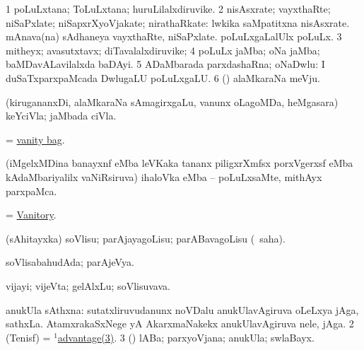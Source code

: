 \bentry
{} 
\gl{\nA}
\bmng
\bnum
\num{1} poLuLxtana; ToLuLxtana; huruLilalxdiruvike. 
\num{2} nisAsxrate; vayxthaRte; niSaPxlate; niSapxrXyoVjakate; nirathaRkate:  lwkika saMpatitxna nisAsxrate.  mAnava(na) sAdhaneya vayxthaRte, niSaPxlate.  poLuLxgaLalUlx poLuLx. 
\num{3} mitheyx; avasutxtavx; diTavalalxdiruvike; 
\num{4} poLuLx jaMba; oNa jaMba; baMDavALavilalxda baDAyi. 
\num{5} ADaMbarada parxdashaRna; oNaDwlu:  I duSaTxparxpaMcada DwlugaLU poLuLxgaLU. 
\num{6} (\ame) alaMkaraNa meVju. 
\enum
\emng
\eentry

\bentry
{}
\gl{\nA}
\expl{}
\bmng
 (kirugananxDi, alaMkaraNa sAmagirxgaLu, \mo vanunx oLagoMDa, heMgasara) keYciVla; jaMbada ciVla. 
\emng
\eentry

\bentry
{}
\gl{\nA}
\expl{}
\bmng
 = \hyperlink{vanity bag}{vanity bag}. 
\emng
\eentry

\bentry
{}
\gl{\nA}
\expl{}
\bmng
 (iMgelxMDina banayxnf eMba leVKaka tananx piligxrXmfsx porxVgerxsf eMba kAdaMbariyalilx vaNiRsiruva) ihaloVka eMba -- poLuLxsaMte, mithAyx parxpaMca. 
\emng
\eentry

\bentry
{}
\gl{\nA}
\expl{}
\bmng
 = \hyperlink{Vanitory}{Vanitory}. 
\emng
\eentry

\bentry
{} 
\gl{\akirx}
\expl{}
\bmng
 (sAhitayxka) soVlisu; parAjayagoLisu; parABavagoLisu (\rUpa\ saha). 
\emng
\eentry

\bentry
{} 
\gl{\gu}
\expl{}
\bmng
 soVlisabahudAda; parAjeVya. 
\emng
\eentry

\bentry
{} 
\gl{\nA}
\expl{}
\bmng
 vijayi; vijeVta; gelAlxLu; soVlisuvava. 
\emng
\eentry

\bentry
{} 
\gl{\nA}
\expl{}
\bmng
\bnum
{} anukUla sAthxna: 
\banum
{} sutatxliruvudanunx noVDalu anukUlavAgiruva oLeLxya jAga, sathxLa. 
 AtamxrakaSxNege yA AkarxmaNakekx anukUlavAgiruva nele, jAga. 
\eanum
\numie
\num{2} (Tenisf) = \hyperref{kandict_a.pdf}{A}{advantage(1)3}{$^1$advantage(3)}. 
\num{3} (\pArxparx) lABa; parxyoVjana; anukUla; swlaBayx. 
\enum
\emng
\eentry

